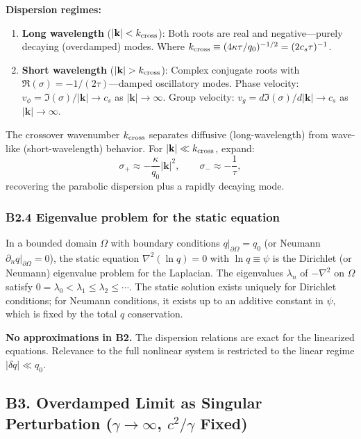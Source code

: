 \documentclass[reprint]{revtex4-2}
\begin{document}
\textbf{Dispersion regimes:}
\begin{enumerate}[label=(\roman*)]
\item \textbf{Long wavelength} ($|\mathbf{k}| < k_{\rm cross}$): Both roots are real and negative---purely decaying (overdamped) modes. Where $k_{\rm cross} \equiv (4\kappa\tau/q_0)^{-1/2} = (2c_s\tau)^{-1}$.
\item \textbf{Short wavelength} ($|\mathbf{k}| > k_{\rm cross}$): Complex conjugate roots with $\Re(\sigma) = -1/(2\tau)$---damped oscillatory modes. Phase velocity: $v_\phi = \Im(\sigma)/|\mathbf{k}| \to c_s$ as $|\mathbf{k}|\to\infty$. Group velocity: $v_g = d\Im(\sigma)/d|\mathbf{k}| \to c_s$ as $|\mathbf{k}|\to\infty$.
\end{enumerate}

The crossover wavenumber $k_{\rm cross}$ separates diffusive (long-wavelength) from wave-like (short-wavelength) behavior. For $|\mathbf{k}|\ll k_{\rm cross}$, expand:
\begin{equation}
\sigma_+ \approx -\frac{\kappa}{q_0}|\mathbf{k}|^2, \qquad \sigma_- \approx -\frac{1}{\tau},
\end{equation}
recovering the parabolic dispersion plus a rapidly decaying mode.

\subsubsection{B2.4 Eigenvalue problem for the static equation}

In a bounded domain $\Omega$ with boundary conditions $q|_{\partial\Omega} = q_0$ (or Neumann $\partial_n q|_{\partial\Omega}=0$), the static equation $\nabla^2(\ln q) = 0$ with $\ln q \equiv \psi$ is the Dirichlet (or Neumann) eigenvalue problem for the Laplacian. The eigenvalues $\lambda_n$ of $-\nabla^2$ on $\Omega$ satisfy $0 = \lambda_0 < \lambda_1 \le \lambda_2 \le \cdots$. The static solution exists uniquely for Dirichlet conditions; for Neumann conditions, it exists up to an additive constant in $\psi$, which is fixed by the total $q$ conservation.

\textbf{No approximations in B2.} The dispersion relations are exact for the linearized equations. Relevance to the full nonlinear system is restricted to the linear regime $|\delta q| \ll q_0$.

\subsection{B3. Overdamped Limit as Singular Perturbation ($\gamma\to\infty$, $c^2/\gamma$ Fixed)}
\end{document}
